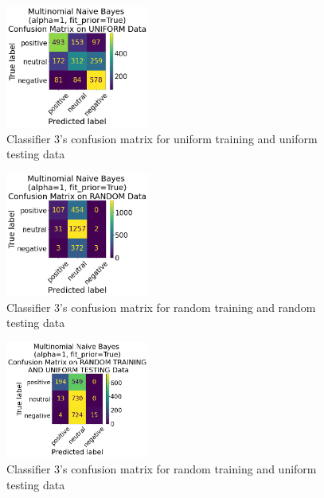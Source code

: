 \documentclass[11pt]{article}
\begin{document}
\begin{figure}[!h]
	\centering
	\includegraphics[width = 0.42\textwidth]{cf/MultinomialNaiveBayesalpha1fit_priorTrue-Uniform-confusion-matrix.png}
	\caption{Classifier 3's confusion matrix for uniform training and uniform testing data}
	\label{fig:cf-3rd-uu}
\end{figure} 

\begin{figure}[!h]
	\centering
	\includegraphics[width = 0.42\textwidth]{cf/MultinomialNaiveBayesalpha1fit_priorTrue-Random-confusion-matrix.png}
	\caption{Classifier 3's confusion matrix for random training and random testing data}
	\label{fig:cf-3rd-rr}
\end{figure} 

\begin{figure}[!h]
	\centering
	\includegraphics[width = 0.42\textwidth]{cf/MultinomialNaiveBayesalpha1fit_priorTrue-RandomTrainingandUniformTesting-confusion-matrix.png}
	\caption{Classifier 3's confusion matrix for random training and uniform testing data}
	\label{fig:cf-3rd-ru}
\end{figure} 
\end{document}
